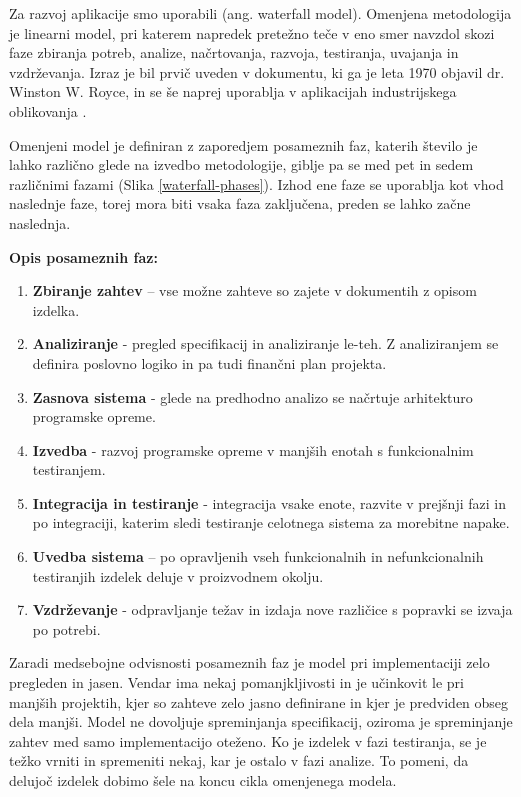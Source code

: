 \documentclass[a4paper, 12pt]{book}
\begin{document}
Za razvoj aplikacije smo uporabili  (ang. waterfall model). Omenjena metodologija je linearni model, pri katerem napredek pretežno teče v eno smer navzdol skozi faze zbiranja potreb, analize, načrtovanja, razvoja, testiranja, uvajanja in vzdrževanja. Izraz je bil prvič uveden v dokumentu, ki ga je leta 1970 objavil dr. Winston W. Royce, in se še naprej uporablja v aplikacijah industrijskega oblikovanja \cite{waterfall-model}.

Omenjeni model je definiran z zaporedjem posameznih faz, katerih število je lahko različno glede na izvedbo metodologije, giblje pa se med pet in sedem različnimi fazami (Slika \ref{waterfall-phases}). Izhod ene faze se uporablja kot vhod naslednje faze, torej mora biti vsaka faza zaključena, preden se lahko začne naslednja.

\begin{description}
    \item \textbf{Opis posameznih faz:}
    \begin{enumerate}
        \item \textbf{Zbiranje zahtev} – vse možne zahteve so zajete v dokumentih z opisom izdelka.
        \item \textbf{Analiziranje} - pregled specifikacij in analiziranje le-teh. Z analiziranjem se definira poslovno logiko in pa tudi finančni plan projekta.
        \item \textbf{Zasnova sistema} - glede na predhodno analizo se načrtuje arhitekturo programske opreme.
        \item \textbf{Izvedba} - razvoj programske opreme v manjših enotah s funkcionalnim testiranjem.
        \item \textbf{Integracija in testiranje} - integracija vsake enote, razvite v prejšnji fazi in po integraciji, katerim sledi testiranje celotnega sistema za morebitne napake.
        \item \textbf{Uvedba sistema} – po opravljenih vseh funkcionalnih in nefunkcionalnih testiranjih izdelek deluje v proizvodnem okolju.
        \item \textbf{Vzdrževanje} - odpravljanje težav in izdaja nove različice s popravki se izvaja po potrebi.
    \end{enumerate}
\end{description}

Zaradi medsebojne odvisnosti posameznih faz je model pri implementaciji zelo pregleden in jasen. Vendar ima nekaj pomanjkljivosti in je učinkovit le pri manjših projektih, kjer so zahteve zelo jasno definirane in kjer je predviden obseg dela manjši.
Model ne dovoljuje spreminjanja specifikacij, oziroma je spreminjanje zahtev med samo implementacijo oteženo. Ko je izdelek v fazi testiranja, se je težko vrniti in spremeniti nekaj, kar je ostalo v fazi analize.
To pomeni, da delujoč izdelek dobimo šele na koncu cikla omenjenega modela. 
\end{document}
